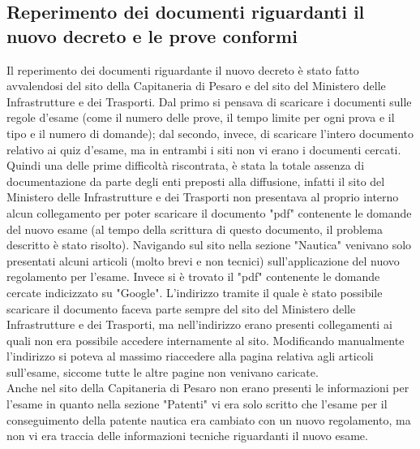 \subsection{Reperimento dei documenti riguardanti il nuovo decreto e le prove conformi}
\raggedright
Il reperimento dei documenti riguardante il nuovo decreto è stato fatto avvalendosi del sito della Capitaneria di Pesaro e del sito del Ministero delle Infrastrutture e dei Trasporti. Dal primo si pensava di scaricare i documenti sulle regole d'esame (come il numero delle prove, il tempo limite per ogni prova e il tipo e il numero di domande); dal secondo, invece,  di scaricare l'intero documento relativo ai quiz d'esame, ma in entrambi i siti non vi erano i documenti cercati. %
Quindi una delle prime difficoltà riscontrata, è stata la totale assenza di documentazione da parte degli enti preposti alla diffusione, infatti  il sito del Ministero delle Infrastrutture e dei Trasporti non presentava al proprio interno alcun collegamento per poter scaricare il documento "pdf" contenente le domande del nuovo esame (al tempo della scrittura di questo documento, il problema descritto è stato risolto). Navigando sul sito nella sezione "Nautica" venivano solo presentati alcuni articoli (molto brevi e non tecnici)  sull'applicazione del nuovo regolamento per l'esame. Invece si è trovato il "pdf" contenente le domande cercate indicizzato su "Google". L'indirizzo  tramite il quale è stato possibile scaricare il documento faceva parte sempre del sito del Ministero delle Infrastrutture e dei Trasporti, ma nell'indirizzo erano presenti collegamenti ai quali non era possibile accedere internamente al sito. Modificando manualmente l'indirizzo  si poteva al massimo riaccedere alla pagina relativa agli articoli sull'esame, siccome tutte le altre pagine non venivano caricate.\\
Anche nel sito della Capitaneria di Pesaro non erano presenti le informazioni per l'esame in quanto nella sezione "Patenti" vi era solo scritto che l'esame per il conseguimento della patente nautica era cambiato con un nuovo regolamento, ma non vi era traccia delle informazioni tecniche riguardanti il nuovo esame.\\
